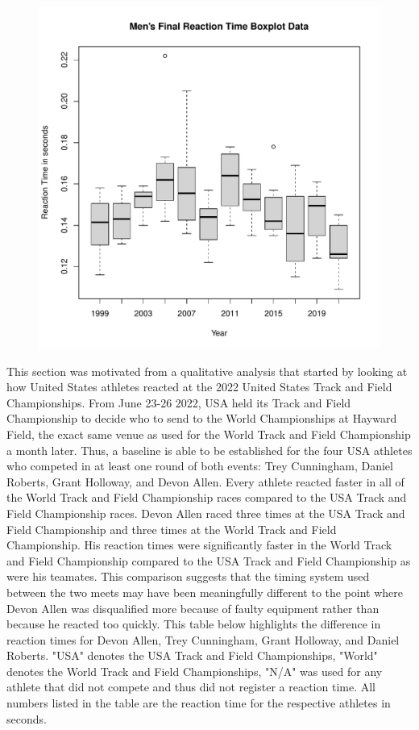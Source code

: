 \documentclass[12pt, letterpaper, titlepage]{article}
\begin{document}
\begin{figure}[h]
  \centering 
  \includegraphics{BoxplotFinals}
  \label{fig:BoxplotFinals}
\end{figure}

This section was motivated from a qualitative analysis that started by looking
at how United States athletes reacted at the 2022 United States Track and Field
Championships. From June 23-26 2022, USA held its Track
and Field Championship to decide who to send to the World Championships at Hayward 
Field, the exact same venue as used for the World Track and Field Championship a month 
later.  Thus, a baseline is able to be established for the four USA athletes who 
competed in at least one round of both events: Trey Cunningham, Daniel Roberts, 
Grant Holloway, and Devon Allen. Every athlete reacted faster in all of the World 
Track and Field Championship races compared to the USA Track and Field 
Championship races. Devon Allen raced three times at the USA Track and
Field Championship and three times at the World Track and Field  Championship. 
His reaction times were significantly faster in the World Track and
Field Championship compared to the USA Track and Field Championship as were his
teamates.  This comparison suggests that the timing system used between the two
meets may have been meaningfully different to the point where Devon Allen was
disqualified more because of faulty equipment rather than because he reacted
too quickly.  This table below highlights the difference in reaction times for
Devon Allen, Trey Cunningham, Grant Holloway, and Daniel Roberts. "USA" denotes
the USA Track and Field Championships, "World" denotes the World Track and Field
Championships, "N/A" was used for any athlete that did not compete and thus
did not register a reaction time.  All numbers listed in the table are the reaction
time for the respective athletes in seconds. 
\end{document}
